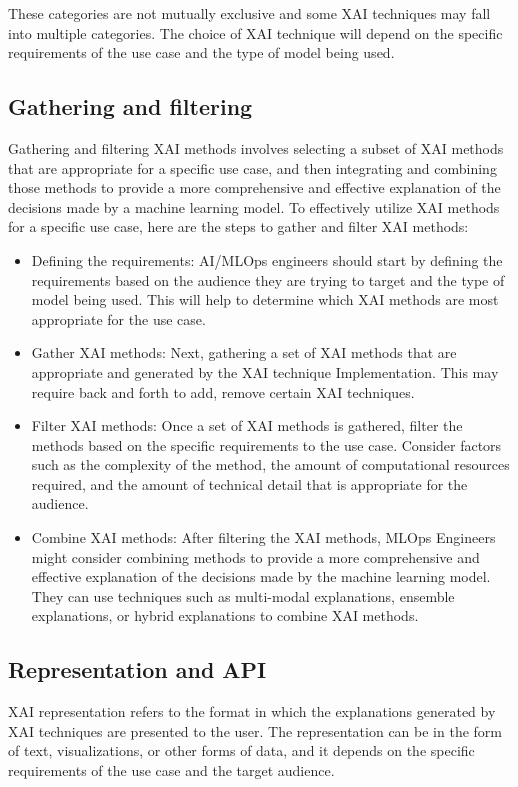 \documentclass[conference]{IEEEtran}
\begin{document}
These categories are not mutually exclusive and some XAI techniques may fall into multiple categories. The choice of XAI technique will depend on the specific requirements of the use case and the type of model being used.

\subsection{Gathering and filtering} Gathering and filtering XAI methods involves selecting a subset of XAI methods that are appropriate for a specific use case, and then integrating and combining those methods to provide a more comprehensive and effective explanation of the decisions made by a machine learning model. To effectively utilize XAI methods for a specific use case, here are the steps to gather and filter XAI methods: 
\begin{itemize}
	\item Defining the requirements: AI/MLOps engineers should start by defining the requirements based on the audience they are trying to target and the type of model being used. This will help to determine which XAI methods are most appropriate for the use case.
	\item Gather XAI methods: Next, gathering a set of XAI methods that are appropriate and generated by the XAI technique Implementation. This may require back and forth to add, remove certain XAI techniques.
	\item Filter XAI methods: Once a set of XAI methods is gathered, filter the methods based on the specific requirements to the use case. Consider factors such as the complexity of the method, the amount of computational resources required, and the amount of technical detail that is appropriate for the audience.
	\item Combine XAI methods: After filtering the XAI methods, MLOps Engineers might consider combining methods to provide a more comprehensive and effective explanation of the decisions made by the machine learning model. They can use techniques such as multi-modal explanations, ensemble explanations, or hybrid explanations to combine XAI methods.
\end{itemize}
\subsection{Representation and API}
XAI representation refers to the format in which the explanations generated by XAI techniques are presented to the user. The representation can be in the form of text, visualizations, or other forms of data, and it depends on the specific requirements of the use case and the target audience.
\end{document}
